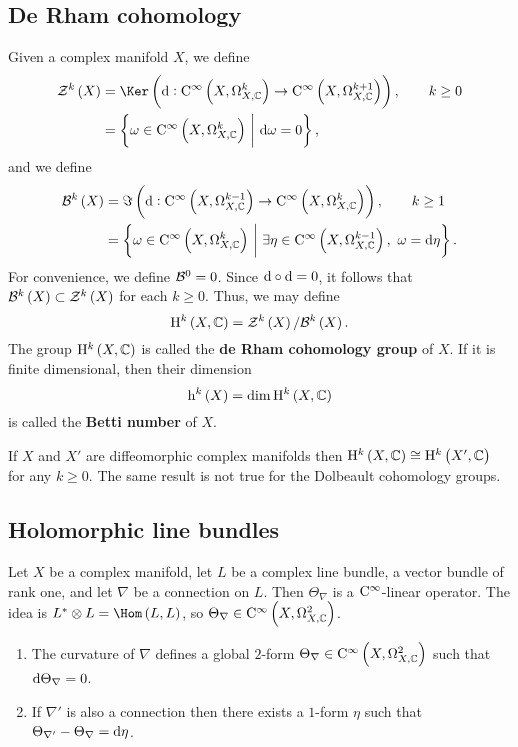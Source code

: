 \pagebreak

\subsection{De Rham cohomology}

Given a complex manifold $ X $, we define
\begin{align*}
\ZZZ^k\br{X}
& = \Ker \br{\d : \C^\infty\br{X, \Omega_{X, \CC}^k} \to \C^\infty\br{X, \Omega_{X, \CC}^{k + 1}}}, \qquad k \ge 0 \\
& = \cbr{\omega \in \C^\infty\br{X, \Omega_{X, \CC}^k} \st \d\omega = 0},
\end{align*}
and we define
\begin{align*}
\BBB^k\br{X}
& = \Im \br{\d : \C^\infty\br{X, \Omega_{X, \CC}^{k - 1}} \to \C^\infty\br{X, \Omega_{X, \CC}^k}}, \qquad k \ge 1 \\
& = \cbr{\omega \in \C^\infty\br{X, \Omega_{X, \CC}^k} \st \exists \eta \in \C^\infty\br{X, \Omega_{X, \CC}^{k - 1}}, \ \omega = \d\eta}.
\end{align*}
For convenience, we define $ \mathcal{B}^0 = 0 $. Since $ \mathrm{d} \circ \mathrm{d} = 0 $, it follows that $ \BBB^k\br{X} \subset \ZZZ^k\br{X} $ for each $ k \ge 0 $. Thus, we may define
$$ \H^k\br{X, \CC} = \ZZZ^k\br{X} / \BBB^k\br{X}. $$
The group $ \H^k\br{X, \CC} $ is called the \textbf{de Rham cohomology group} of $ X $. If it is finite dimensional, then their dimension
$$ \h^k\br{X} = \dim \H^k\br{X, \CC} $$
is called the \textbf{Betti number} of $ X $.

\begin{remark}
If $ X $ and $ X' $ are diffeomorphic complex manifolds then $ \H^k\br{X, \CC} \cong \H^k\br{X', \CC} $ for any $ k \ge 0 $. The same result is not true for the Dolbeault cohomology groups.
\end{remark}

\subsection{Holomorphic line bundles}

Let $ X $ be a complex manifold, let $ L $ be a complex line bundle, a vector bundle of rank one, and let $ \nabla $ be a connection on $ L $. Then $ \Theta_\nabla $ is a $ \mathrm{C}^\infty $-linear operator. The idea is $ L^* \otimes L = \Hom\br{L, L} $, so $ \Theta_\nabla \in \C^\infty\br{X, \Omega_{X, \CC}^2} $.

\begin{proposition}
\hfill
\begin{enumerate}
\item The curvature of $ \nabla $ defines a global $ 2 $-form $ \Theta_\nabla \in \C^\infty\br{X, \Omega_{X, \CC}^2} $ such that $ \mathrm{d}\Theta_\nabla = 0 $.
\item If $ \nabla' $ is also a connection then there exists a $ 1 $-form $ \eta $ such that $ \Theta_{\nabla'} - \Theta_\nabla = \mathrm{d}\eta $.
\end{enumerate}
\end{proposition}


